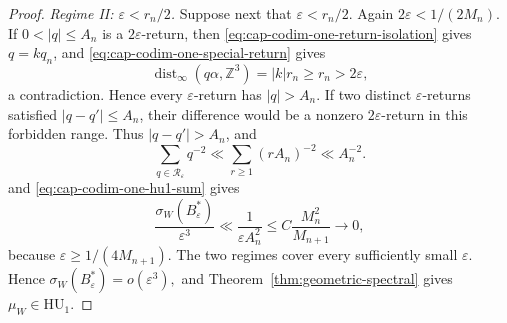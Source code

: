 \documentclass[11pt,reqno,a4paper]{amsart}
\numberwithin{equation}{section}
\theoremstyle{compact}
\theoremstyle{definition}
\theoremstyle{definition}
\newcommand{\HU}{\mathrm{HU}}
\begin{document}
\begin{proof}
\smallskip\noindent\emph{Regime II: $\varepsilon<r_n/2$.}
Suppose next that $\varepsilon<r_n/2$.  Again $2\varepsilon<1/(2M_n)$.  If
$0<|q|\leq A_n$ is a $2\varepsilon$-return, then
\eqref{eq:cap-codim-one-return-isolation} gives $q=kq_n$, and
\eqref{eq:cap-codim-one-special-return} gives
\[
  \operatorname{dist}_\infty(q\alpha,\mathbb Z^3)
  =|k|r_n\geq r_n>2\varepsilon,
\]
a contradiction.  Hence every $\varepsilon$-return has $|q|>A_n$.
If two distinct $\varepsilon$-returns satisfied $|q-q'|\leq A_n$, their
difference would be a nonzero $2\varepsilon$-return in this forbidden range.
Thus $|q-q'|>A_n$, and
\[
  \sum_{q\in\mathcal R_\varepsilon}q^{-2}
  \ll\sum_{r\geq1}(rA_n)^{-2}
  \ll A_n^{-2}.
\]
and \eqref{eq:cap-codim-one-hu1-sum} gives
\begin{equation}\label{eq:cap-codim-one-second-regime}
  \frac{\sigma_W(B_\varepsilon^*)}{\varepsilon^3}
  \ll\frac1{\varepsilon A_n^2}
  \leq C\frac{M_n^2}{M_{n+1}}
  \longrightarrow0,
\end{equation}
because $\varepsilon\geq1/(4M_{n+1})$.  The two regimes cover every
sufficiently small $\varepsilon$.  Hence
\(
  \sigma_W(B_\varepsilon^*)=o(\varepsilon^3),
\)
and Theorem~\ref{thm:geometric-spectral} gives $\mu_W\in\HU_1$.


\end{proof}
\end{document}
